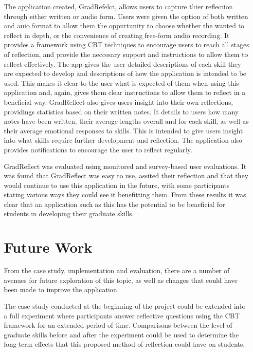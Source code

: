 \documentclass{l4proj}
\begin{document}
The application created, GradRefelct, allows users to capture thier reflection through either written or audio form. Users were given the option of both written and auio format to allow them the oppurtunity to choose whether the wanted to reflect in depth, or the convenience of creating free-form audio recording. It provides a framework using CBT techniques to encourage users to reach all stages of reflection, and provide the neccesary support and instructions to allow them to reflect effectively. The app gives the user detailed descriptions of each skill they are expected to develop and descriptions of how the application is intended to be used. This makes it clear to the user what is expected of them when using this application and, again, gives them clear instructions to allow them to reflect in a beneficial way. GradReflect also gives users insight into their own reflections, providings statistics based on their written notes. It details to users how many notes have been written, their average lengths overall and for each skill, as well as their average emotional responses to skills. This is intended to give users insight into what skills require further development and reflection. The application also provides notifications to encourage the user to reflect regularly. 

GradReflect was evaluated using monitored and survey-based user evaluations. It was found that GradReflect was easy to use, assited their reflection and that they would continue to use this application in the future, with some participants stating various ways they could see it benefitting them. From these results it was clear that an application such as this has the potential to be beneficial for students in developing their graduate skills.


\section{Future Work}

From the case study, implementation and evaluation, there are a number of avenues for future exploration of this topic, as well as changes that could have been made to improve the application. 

The case study conducted at the beginning of the project could be extended into a full experiment where participants answer reflective questions using the CBT framework for an extended period of time. Comparisons between the level of graduate skills before and after the experiment could be used to determine the long-term effects that this proposed method of reflection could have on students. 
\end{document}
